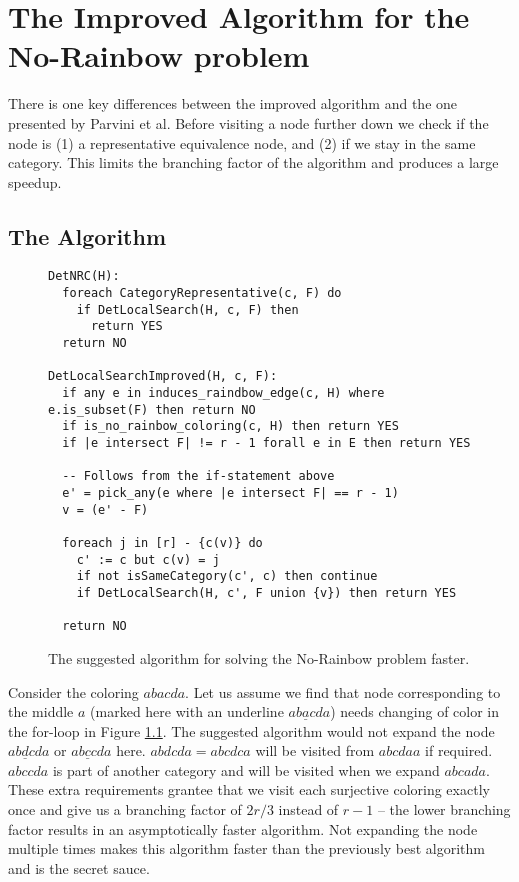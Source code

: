 \documentclass{book}
\theoremstyle{definition}
\begin{document}
\chapter{The Improved Algorithm for the No-Rainbow problem}
There is one key differences between the improved algorithm and the one presented by Parvini et al. Before visiting a node further down we check if the node is (1) a representative equivalence node, and (2) if we stay in the same category. This limits the branching factor of the algorithm and produces a large speedup.


\section{The Algorithm}
\begin{figure}
\begin{verbatim}
DetNRC(H):
  foreach CategoryRepresentative(c, F) do
    if DetLocalSearch(H, c, F) then
      return YES
  return NO

DetLocalSearchImproved(H, c, F):
  if any e in induces_raindbow_edge(c, H) where e.is_subset(F) then return NO
  if is_no_rainbow_coloring(c, H) then return YES
  if |e intersect F| != r - 1 forall e in E then return YES

  -- Follows from the if-statement above
  e' = pick_any(e where |e intersect F| == r - 1)
  v = (e' - F)

  foreach j in [r] - {c(v)} do
    c' := c but c(v) = j
    if not isSameCategory(c', c) then continue
    if DetLocalSearch(H, c', F union {v}) then return YES

  return NO
\end{verbatim}
\label{alg:nrc++}
\caption{The suggested algorithm for solving the No-Rainbow problem faster.}

\end{figure}

Consider the coloring $abacda$. Let us assume we find that node corresponding to the middle $a$ (marked here with an underline $ab\underline{a}cda$) needs changing of color in the for-loop in Figure \ref{alg:nrc++}. The suggested algorithm would not expand the node $ab\underline{d}cda$ or $ab\underline{c}cda$ here. $abdcda = abcdca$ will be visited from $abcdaa$ if required. $abccda$ is part of another category and will be visited when we expand $abcada$. These extra requirements grantee that we visit each surjective coloring exactly once and give us a branching factor of $2r/3$ instead of $r-1$ -- the lower branching factor results in an asymptotically faster algorithm. Not expanding the node multiple times makes this algorithm faster than the previously best algorithm and is the secret sauce.
\end{document}
